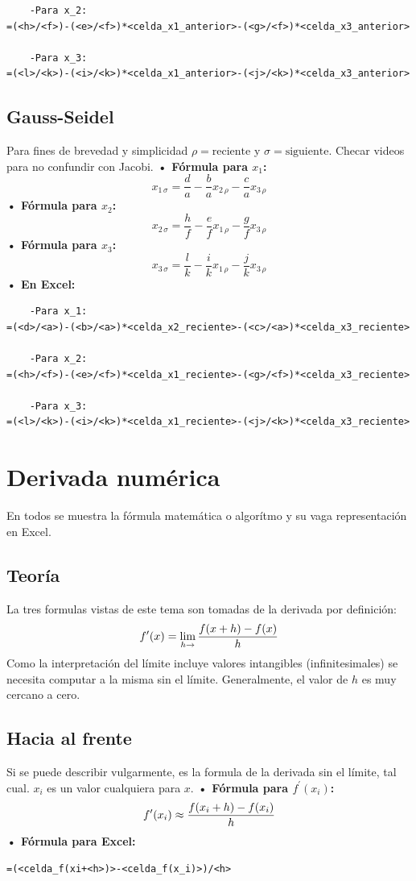 \documentclass[letterpaper, 12pt]{article}
\begin{document}
\begin{justify}
\begin{verbatim}
    -Para x_2:
=(<h>/<f>)-(<e>/<f>)*<celda_x1_anterior>-(<g>/<f>)*<celda_x3_anterior>

    -Para x_3:
=(<l>/<k>)-(<i>/<k>)*<celda_x1_anterior>-(<j>/<k>)*<celda_x3_anterior>
\end{verbatim}
        \subsection{Gauss-Seidel}
        \justify
        Para fines de brevedad y simplicidad \(\rho=\text{reciente}\) y \(\sigma=\text{siguiente}\). Checar videos para no confundir con Jacobi.
        \justify
        \textbf{• Fórmula para \(x_1\):}
        {\large \[x_{1\,\sigma}=\frac{d}{a}-\frac{b}{a}x_{2\,\rho}-\frac{c}{a}x_{3\,\rho}\]}
        \justify
        \textbf{• Fórmula para \(x_2\):}
        \justify
        {\large \[x_{2\, \sigma}=\frac{h}{f}-\frac{e}{f}x_{1\,\rho}-\frac{g}{f}x_{3\,\rho}\]}
        \textbf{• Fórmula para \(x_3\):}
        \justify
        {\large \[x_{3\, \sigma}=\frac{l}{k}-\frac{i}{k}x_{1\,\rho}-\frac{j}{k}x_{3\,\rho}\]}
        \textbf{• En Excel:}
\begin{verbatim}
    -Para x_1:
=(<d>/<a>)-(<b>/<a>)*<celda_x2_reciente>-(<c>/<a>)*<celda_x3_reciente>

    -Para x_2:
=(<h>/<f>)-(<e>/<f>)*<celda_x1_reciente>-(<g>/<f>)*<celda_x3_reciente>

    -Para x_3:
=(<l>/<k>)-(<i>/<k>)*<celda_x1_reciente>-(<j>/<k>)*<celda_x3_reciente>
\end{verbatim}
        \section{Derivada numérica}
        \justify
        En todos se muestra la fórmula matemática o algorítmo y su vaga representación en Excel.
        \subsection{Teoría}
        \justify
        La tres formulas vistas de este tema son tomadas de la derivada por definición:
        {\large \[f^{\prime}(x)=\lim_{h\rightarrow}{f(x+h)-f(x)\over h}\]}
        \justify
        Como la interpretación del límite incluye valores intangibles (infinitesimales) se necesita computar a la misma sin el límite. Generalmente,
        el valor de \(h\) es muy cercano a cero. 
        \subsection{Hacia al frente}
        \justify
        Si se puede describir vulgarmente, es la formula de la derivada sin el límite, tal cual. \(x_i\) es un valor cualquiera para \(x\).
        \justify
        \textbf{• Fórmula para \(f^{\prime}(x_i)\):}
        {\large \[f^{\prime}(x_i)\approx{f(x_i+h)-f(x_i)\over h}\]}
        \justify
        \textbf{• Fórmula para Excel:}
\begin{verbatim}
=(<celda_f(xi+<h>)>-<celda_f(x_i)>)/<h>
\end{verbatim}

\end{justify}
\end{document}
